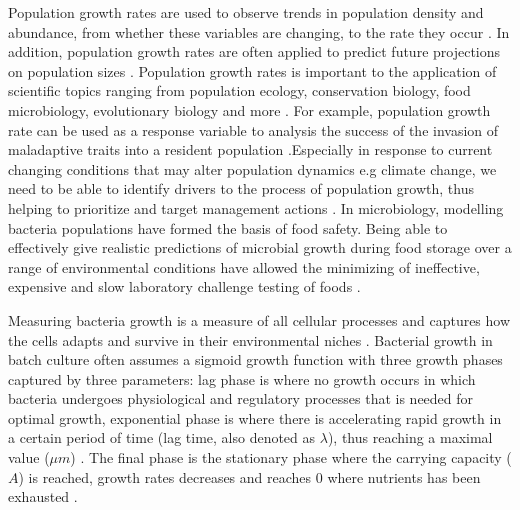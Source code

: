 \documentclass[11pt]{article}
\begin{document}
\linenumbers
Population growth rates are used to observe trends in population density and abundance, from 
whether these variables are changing, to the rate they occur \cite{sibly_population_2002}. In addition, population 
growth rates are often applied to predict future projections on population sizes \cite{sibly_population_2002}. Population 
growth rates is important to the application of scientific topics ranging from population ecology, 
conservation biology, food microbiology, evolutionary biology and more \cite{sibly_population_2002,sibly_population_2002-1}. For example, 
population growth rate can be used as a response variable to analysis the success of the invasion 
of maladaptive traits into a resident population \cite{sibly_population_2002-1}.Especially in response to current changing 
conditions that may alter population dynamics e.g climate change, we need to be able to identify 
drivers to the process of population growth, thus helping to prioritize and target management actions \cite{eacker_assessing_2017}. 
In microbiology, modelling bacteria populations have formed the basis of food safety. Being able 
to effectively give realistic predictions of microbial growth during food storage over a range of 
environmental conditions have allowed the minimizing of ineffective, expensive and slow laboratory 
challenge testing of foods \cite{soboleva_predictive_2000,baranyi_mathematics_1995,perni_estimating_2005}. 

Measuring bacteria growth is a measure of all cellular processes and captures how the cells adapts and 
survive in their environmental niches \cite{tonner_bayesian_2020}. Bacterial growth in batch culture often assumes a sigmoid growth 
function with three growth phases captured by three parameters: lag phase is where no growth occurs in which 
bacteria undergoes physiological and regulatory processes that is needed for optimal growth, exponential
phase is where there is accelerating rapid growth in a certain period of time (lag time, also denoted as $\lambda$),
thus reaching a maximal value ($\mu m$) \cite{rolfe_lag_2012}. The final phase is the stationary phase where the carrying capacity ($A$) is reached, 
growth rates decreases and reaches 0 where nutrients has been exhausted \cite{tonner_detecting_2017,zwietering_modeling_1990}.  


\end{document}
